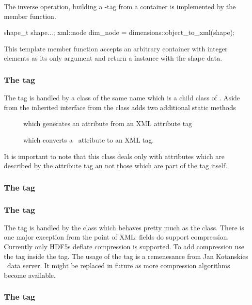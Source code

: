 The inverse operation, building a -tag from a container is 
implemented by the  member function. 
\begin{cppcode}
shape_t shape{...};
xml::node dim_node = dimensions::object_to_xml(shape);
\end{cppcode}
This template member function accepts an arbitrary container with integer 
elements as its only argument and return a  instance 
with the shape data.

\subsubsection{The  tag}
The  tag is handled by a class of the same name which is 
a child class of . Aside from the inherited interface from 
 the  class adds two additional static methods 
\begin{description}
    \item[] which generates an attribute from an 
    XML attribute tag
    \item[] which converts a \nexus\ attribute to 
    an XML tag.
\end{description}
It is important to note that this class deals only with attributes which 
are described by the attribute tag an not those which are part of the 
tag itself. 

\subsubsection{The  tag}

\subsubsection{The  tag}
The  tag is handled by the  class which behaves pretty 
much as the  class. There is one major exception from the 
point of XML: fields do support compression. Currently only HDF5s deflate
compression is supported. To add compression use the  tag 
inside the  tag. The usage of the  tag is a 
remenesance from Jan Kotanskies \nexus\ data server. It might be replaced 
in future as more compression algorithms become available. 

\subsubsection{The  tag}





